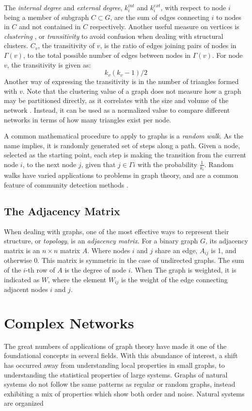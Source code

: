 The \textit{internal degree} and \textit{external degree}, $k^{int}_i$ and $k^{ext}_i$, with respect to node $i$ being a member of subgraph $C\subset G$, are the sum of edges connecting $i$ to nodes in $C$ and not contained in $C$ respectively. 
Another useful measure on vertices is \textit{clustering} \cite{Watts1998}, or \textit{transitivity} to avoid confusion when dealing with structural clusters. $C_v$, the transitivity of $v$, is the ratio of edges joining pairs of nodes in $\Gamma(v)$, to the total possible number of edges between nodes in $\Gamma(v)$. For node $v$, the transitivity is given as: $$k_v(k_v-1)/2$$ Another way of expressing the transitivity is in the number of triangles formed with $v$. Note that the clustering value of a graph does not measure how a graph may be partitioned directly, as it correlates with the size and volume of the network \cite{Kunegis2013}. Instead, it can be used as a normalized value to compare different networks in terms of how many triangles exist per node.

A common mathematical procedure to apply to graphs is a \textit{random walk}. As the name implies, it is  randomly generated set of steps along a path. Given a node, selected as the starting point, each step is making the transition from the current node $i$, to the next node $j$, given that $j\in\Gamma{i}$ with the probability $\frac{1}{k_i}$. Random walks have varied applications to problems in graph theory, and are a common feature of community detection methods \cite{Pons2006}.




\subsection{The Adjacency Matrix}
When dealing with graphs, one of the most effective ways to represent their structure, or \textit{topology}, is an \textit{adjacency matrix}. For a binary graph $G$, its adjacency matrix is an $n\times n$ matrix $A$. Where nodes $i$ and $j$ share an edge, $A_{ij}$ is 1, and otherwise 0. This matrix is symmetric in the case of undirected graphs. The sum of the $i$-th row of $A$ is the degree of node $i$.
When The graph is weighted, it is indicated as $W$, where the element $W_{ij}$ is the weight of the edge connecting adjacent nodes $i$ and $j$.

\section{Complex Networks}
The great numbers of applications of graph theory have made it one of the foundational concepts in several fields. With this abundance of interest, a shift has occurred away from understanding local properties in small graphs, to understanding the statistical properties of large systems. Graphs of natural systems do not follow the same patterns as regular or random graphs, instead exhibiting a mix of properties which show both order and noise. Natural systems are organized %

